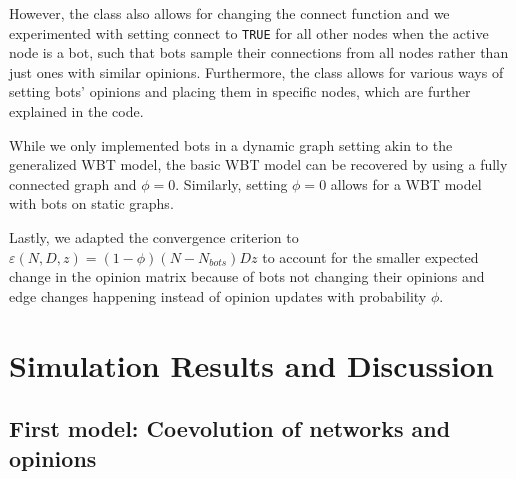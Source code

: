 \documentclass[11pt]{article}
\begin{document}
However, the class also allows for changing the connect function and we experimented with setting connect to \texttt{TRUE} for all other nodes when the active node is a bot, such that bots sample their connections from all nodes rather than just ones with similar opinions. Furthermore, the class allows for various ways of setting bots' opinions and placing them in specific nodes, which are further explained in the code. 

While we only implemented bots in a dynamic graph setting akin to the generalized WBT model, the basic WBT model can be recovered by using a fully connected graph and $\phi=0$. Similarly, setting $\phi=0$ allows for a WBT model with bots on static graphs. 

Lastly, we adapted the convergence criterion to $\varepsilon(N,D,z) = (1-\phi)(N-N_{bots})Dz$  to account for the smaller expected change in the opinion matrix because of bots not changing their opinions and edge changes happening instead of opinion updates with probability $\phi$. 




\section{Simulation Results and Discussion} \label{resanddis}
\subsection{First model: Coevolution of networks and opinions}
\end{document}
